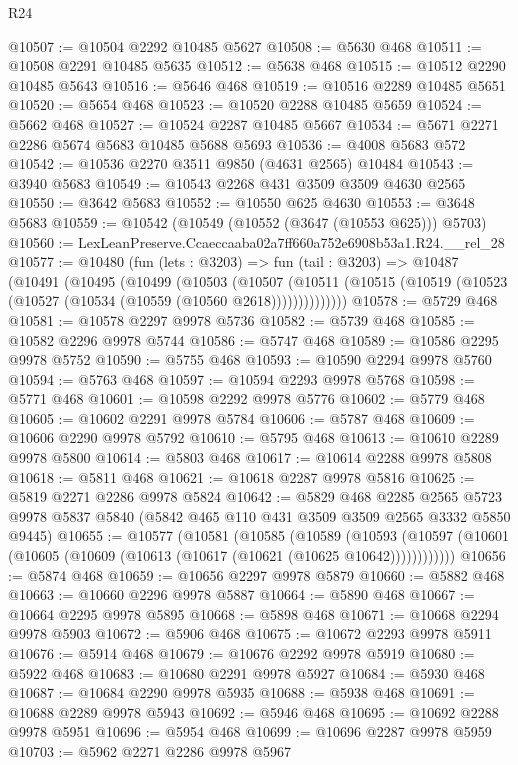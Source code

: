 \begin{lexlean}{R24}
\begin{coremodule}
@10507 := @10504 @2292 @10485 @5627
@10508 := @5630 @468
@10511 := @10508 @2291 @10485 @5635
@10512 := @5638 @468
@10515 := @10512 @2290 @10485 @5643
@10516 := @5646 @468
@10519 := @10516 @2289 @10485 @5651
@10520 := @5654 @468
@10523 := @10520 @2288 @10485 @5659
@10524 := @5662 @468
@10527 := @10524 @2287 @10485 @5667
@10534 := @5671 @2271 @2286 @5674 @5683 @10485 @5688 @5693
@10536 := @4008 @5683 @572
@10542 := @10536 @2270 @3511 @9850 (@4631 @2565) @10484
@10543 := @3940 @5683
@10549 := @10543 @2268 @431 @3509 @3509 @4630 @2565
@10550 := @3642 @5683
@10552 := @10550 @625 @4630
@10553 := @3648 @5683
@10559 := @10542 (@10549 (@10552 (@3647 (@10553 @625))) @5703)
@10560 := LexLeanPreserve.Ccaeccaaba02a7ff660a752e6908b53a1.R24.__rel_28
@10577 := @10480
    (fun (lets : @3203) =>
    fun (tail : @3203) =>
    @10487
      (@10491
        (@10495
          (@10499
            (@10503
              (@10507
                (@10511 (@10515 (@10519 (@10523 (@10527 (@10534 (@10559 (@10560 @2618))))))))))))))
@10578 := @5729 @468
@10581 := @10578 @2297 @9978 @5736
@10582 := @5739 @468
@10585 := @10582 @2296 @9978 @5744
@10586 := @5747 @468
@10589 := @10586 @2295 @9978 @5752
@10590 := @5755 @468
@10593 := @10590 @2294 @9978 @5760
@10594 := @5763 @468
@10597 := @10594 @2293 @9978 @5768
@10598 := @5771 @468
@10601 := @10598 @2292 @9978 @5776
@10602 := @5779 @468
@10605 := @10602 @2291 @9978 @5784
@10606 := @5787 @468
@10609 := @10606 @2290 @9978 @5792
@10610 := @5795 @468
@10613 := @10610 @2289 @9978 @5800
@10614 := @5803 @468
@10617 := @10614 @2288 @9978 @5808
@10618 := @5811 @468
@10621 := @10618 @2287 @9978 @5816
@10625 := @5819 @2271 @2286 @9978 @5824
@10642 := @5829
    @468
    @2285
    @2565
    @5723
    @9978
    @5837
    @5840
    (@5842 @465 @110 @431 @3509 @3509 @2565 @3332 @5850 @9445)
@10655 := @10577
    (@10581
      (@10585
        (@10589
          (@10593 (@10597 (@10601 (@10605 (@10609 (@10613 (@10617 (@10621 (@10625 @10642))))))))))))
@10656 := @5874 @468
@10659 := @10656 @2297 @9978 @5879
@10660 := @5882 @468
@10663 := @10660 @2296 @9978 @5887
@10664 := @5890 @468
@10667 := @10664 @2295 @9978 @5895
@10668 := @5898 @468
@10671 := @10668 @2294 @9978 @5903
@10672 := @5906 @468
@10675 := @10672 @2293 @9978 @5911
@10676 := @5914 @468
@10679 := @10676 @2292 @9978 @5919
@10680 := @5922 @468
@10683 := @10680 @2291 @9978 @5927
@10684 := @5930 @468
@10687 := @10684 @2290 @9978 @5935
@10688 := @5938 @468
@10691 := @10688 @2289 @9978 @5943
@10692 := @5946 @468
@10695 := @10692 @2288 @9978 @5951
@10696 := @5954 @468
@10699 := @10696 @2287 @9978 @5959
@10703 := @5962 @2271 @2286 @9978 @5967

\end{coremodule}
\end{lexlean}
